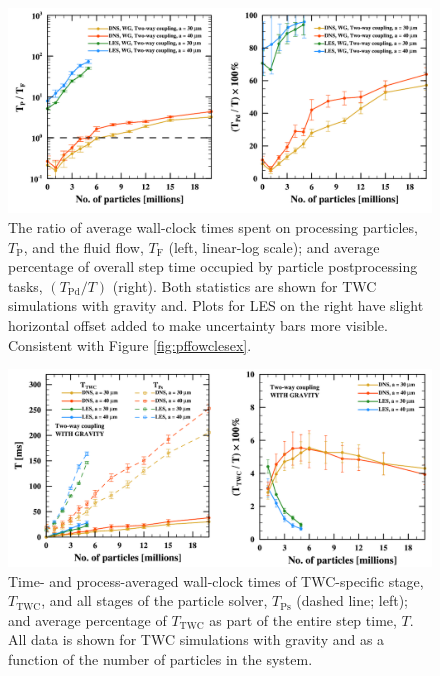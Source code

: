 
\begin{figure}
\centering
\includegraphics[width=13.5cm]{figures/3-10_pfftwcex.pdf}
\caption{
The ratio of average wall-clock times spent on processing particles, $T_{\text{P}}$, and the fluid flow, $T_{\text{F}}$ (left, linear-log scale); and average percentage of overall step time occupied by particle postprocessing tasks, $(T_{\text{Pd}} / T)$ (right).
Both statistics are shown for TWC simulations with gravity and.
Plots for LES on the right have slight horizontal offset added to make uncertainty bars more visible.
Consistent with Figure \ref{fig:pffowclesex}.
}
\label{fig:pfftwcex}
\end{figure}

    
\begin{figure}
\centering
\includegraphics[width=13.5cm]{figures/3-11_pfftwctwc.pdf}
\caption{
Time- and process-averaged wall-clock times of TWC-specific stage, $T_{\text{TWC}}$, and all stages of the particle solver, $T_{\text{Ps}}$ (dashed line; left); and average percentage of $T_{\text{TWC}}$ as part of the entire step time, $T$.
All data is shown for TWC simulations with gravity and as a function of the number of particles in the system.
}
\label{fig:pfftwctwc}
\end{figure}

